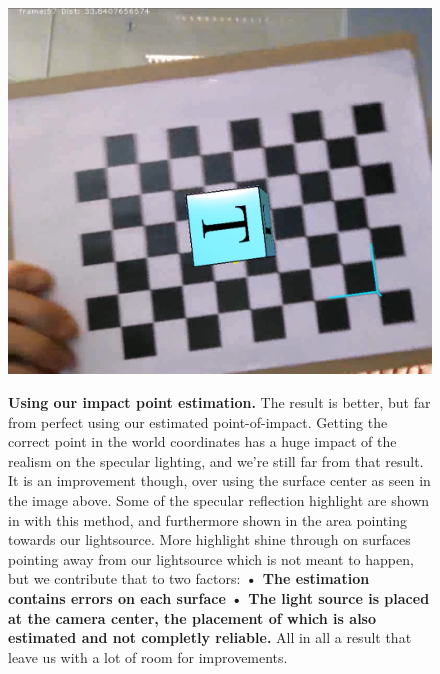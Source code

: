 \begin{figure}[!htbp]
    \includegraphics{pics/EstimatedLight.png}
    \label{fig:EstimatedImpactPoint}
    \caption{\textbf{Using our impact point estimation.}
     The result is better, but far from perfect using our estimated point-of-impact. Getting the correct point in the world coordinates has a huge impact of the realism on the specular lighting, and we're still far from that result. It is an improvement though, over using the surface center as seen in the image above. Some of the specular reflection highlight are shown in with this method, and furthermore shown in the area pointing towards our lightsource. More highlight shine through on surfaces pointing away from our lightsource which is not meant to happen, but we contribute that to two factors:
\textbf{• The estimation contains errors on each surface}
\textbf{• The light source is placed at the camera center, the placement of which is also estimated and not completly reliable.}
All in all a result that leave us with a lot of room for improvements.}
\end{figure}



